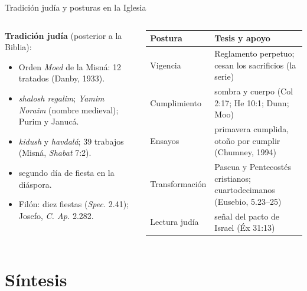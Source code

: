 \documentclass[hyperref={bookmarks=false},aspectratio=169]{beamer}
\newcommand{\destacar}[1]{\textbf{\textcolor{tierraroja}{#1}}}
\begin{document}
\begin{frame}{Tradición judía y posturas en la Iglesia}
\begin{columns}[t,onlytextwidth]
\begin{column}{0.44\textwidth}\scriptsize
\destacar{Tradición judía} (posterior a la Biblia):
\begin{itemize}
\item Orden \emph{Moed} de la Misná: 12 tratados (Danby, 1933).
\item \emph{shalosh regalim}; \emph{Yamim Noraim} (nombre medieval); Purim y Janucá.
\item \emph{kidush} y \emph{havdalá}; 39 trabajos (Misná, \emph{Shabat} 7:2).
\item segundo día de fiesta en la diáspora.
\item Filón: diez fiestas (\emph{Spec.} 2.41); Josefo, \emph{C. Ap.} 2.282.
\end{itemize}
\end{column}
\begin{column}{0.54\textwidth}
\scriptsize\renewcommand{\arraystretch}{1.05}
\begin{tabular}{@{}L{2.0cm}L{4.4cm}@{}}
\toprule
\textbf{Postura} & \textbf{Tesis y apoyo} \\ \midrule
Vigencia & Reglamento perpetuo; cesan los sacrificios (la serie) \\
Cumplimiento & sombra y cuerpo (Col 2:17; He 10:1; Dunn; Moo) \\
Ensayos & primavera cumplida, otoño por cumplir (Chumney, 1994) \\
Transformación & Pascua y Pentecostés cristianos; cuartodecimanos (Eusebio, 5.23--25) \\
Lectura judía & señal del pacto de Israel (Éx 31:13) \\
\bottomrule
\end{tabular}
\end{column}
\end{columns}
\end{frame}

\section{Síntesis}
\end{document}
